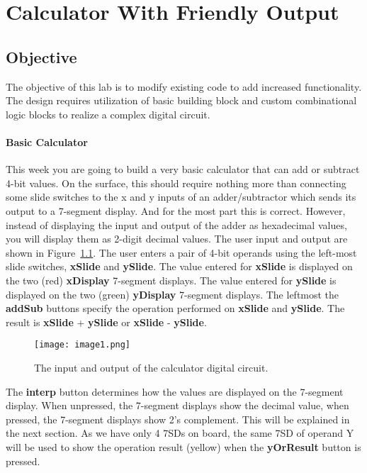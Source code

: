 \chapter{Calculator With Friendly Output}
\label{chapter:calc}
\graphicspath{ {./Lab06Calculator/Fig} }

\hypertarget{objective}{%
\section{Objective}\label{section:calcObjective}}

The objective of this lab is to modify existing code to add increased
functionality. The design requires utilization of basic building block
and custom combinational logic blocks to realize a complex digital
circuit.

\subsubsection{Basic Calculator}

This week you are going to build a very basic calculator that can add or
subtract 4-bit values. On the surface, this should require nothing more
than connecting some slide switches to the x and y inputs of an
adder/subtractor which sends its output to a 7-segment display. And for
the most part this is correct. However, instead of displaying the input
and output of the adder as hexadecimal values, you will display them as
2-digit decimal values. The user input and output are shown in Figure~\ref{fig:calcDevBoard}.
The user enters a pair of 4-bit operands using the left-most slide
switches, \textbf{xSlide} and \textbf{ySlide}. The value entered for
\textbf{xSlide} is displayed on the two (red) \textbf{xDisplay}
7-segment displays. The value entered for \textbf{ySlide} is displayed
on the two (green) \textbf{yDisplay} 7-segment displays. The leftmost
the \textbf{addSub} buttons specify the operation performed on
\textbf{xSlide} and \textbf{ySlide}. The result is \textbf{xSlide} +
\textbf{ySlide} or \textbf{xSlide} - \textbf{ySlide}. 

\begin{figure}[ht]
\texttt{[image:  image1.png]}
\caption{The input and output of the calculator digital circuit.}
\label{fig:calcDevBoard}
\end{figure}

The
\textbf{interp} button determines how the values are displayed on the
7-segment display. When unpressed, the 7-segment displays show the
decimal value, when pressed, the 7-segment displays show 2's complement.
This will be explained in the next section. As we have only 4 7SDs on
board, the same 7SD of operand Y will be used to show the operation
result (yellow) when the \textbf{yOrResult} button is pressed.

